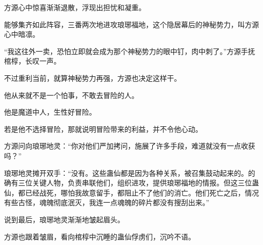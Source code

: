 \begin{this_body}
方源心中惊喜渐渐退散，浮现出担忧和凝重。

能够集齐如此阵容，三番两次地进攻琅琊福地，这个隐居幕后的神秘势力，叫方源心中暗凛。

“我这往外一卖，恐怕立即就会成为那个神秘势力的眼中钉，肉中刺了。”方源手抚棺椁，长叹一声。

不过重利当前，就算神秘势力再强，方源也决定这样干。

他从来就不是一个怕事，不敢去冒险的人。

他是魔道中人，生性好冒险。

若是他不选择冒险，那就说明冒险带来的利益，并不令他心动。

方源问向琅琊地灵：“你对他们严加拷问，施展了许多手段，难道就没有一点收获吗？”

琅琊地灵摊开双手：“没有。这些蛊仙都是因为各种关系，被召集鼓动起来的。的确有三位关键人物，负责串联他们，组织进攻，提供琅琊福地的情报。但这三位蛊仙，都已经战死，哪怕我故意留手，都阻止不了他们的消亡。他们死亡之后，情况有些古怪，魂魄彻底泯灭，我连一点魂魄的碎片都没有搜刮出来。”

说到最后，琅琊地灵渐渐地皱起眉头。

方源也跟着皱眉，看向棺椁中沉睡的蛊仙俘虏们，沉吟不语。

\end{this_body}

